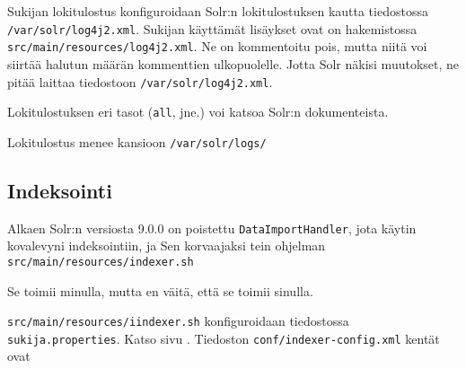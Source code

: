 \documentclass[12pt]{article}
\begin{document}
Sukijan lokitulostus konfiguroidaan Solr:n lokitulostuksen kautta
tiedostossa \verb=/var/solr/log4j2.xml=. Sukijan käyttämät lisäykset
ovat on hakemistossa \verb=src/main/resources/log4j2.xml=. Ne on
kommentoitu pois, mutta niitä voi siirtää halutun määrän kommenttien
ulkopuolelle. Jotta Solr näkisi muutokset, ne pitää laittaa tiedostoon
\verb=/var/solr/log4j2.xml=.

Lokitulostuksen eri tasot (\verb=all=, jne.) voi katsoa Solr:n
dokumenteista.

Lokitulostus menee kansioon \verb=/var/solr/logs/=


\newpage
\subsection*{Indeksointi}

Alkaen Solr:n versiosta 9.0.0 on poistettu \verb=DataImportHandler=,
jota käytin kovalevyni indeksointiin, ja Sen korvaajaksi tein ohjelman
\verb=src/main/resources/indexer.sh=

Se toimii minulla, mutta en väitä, että se toimii sinulla.

\verb=src/main/resources/iindexer.sh= konfiguroidaan tiedostossa
\verb|sukija.properties|. Katso sivu .
Tiedoston \verb=conf/indexer-config.xml= kentät ovat
\end{document}
